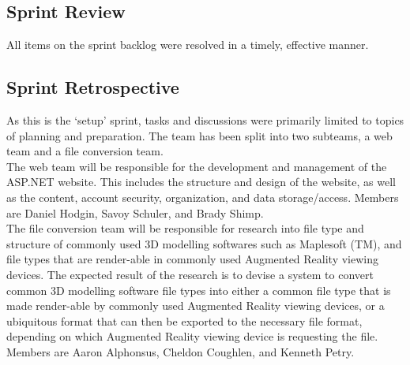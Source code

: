     \subsection{Sprint Review}
    \label{sec:Sprint0_review}
        \hspace{7mm}
        All items on the sprint backlog were resolved in a timely, effective manner.

    \subsection{Sprint Retrospective}
    \label{sec:Sprint0_retrospective}
        \hspace{7mm}
        As this is the `setup' sprint, tasks and discussions were primarily limited to topics of planning and preparation.
        The team has been split into two subteams, a web team and a file conversion team.\\ 

        The web team will be responsible for the development and management of the ASP.NET website.  This includes the
        structure and design of the website,  as well as the content, account security, organization, and data 
        storage/access.  Members are Daniel Hodgin, Savoy Schuler, and Brady Shimp.\\

        The file conversion team will be responsible for research into file type and structure of commonly used 3D modelling
        softwares such as Maplesoft (TM), and file types that are render-able in commonly used Augmented Reality viewing devices.
        The expected result of the research is to devise a system to convert common 3D modelling software file types into either
        a common file type that is made render-able by commonly used Augmented Reality viewing devices, or a ubiquitous format
        that can then be exported to the necessary file format, depending on which Augmented Reality viewing device is 
        requesting the file. Members are Aaron Alphonsus, Cheldon Coughlen, and Kenneth Petry.